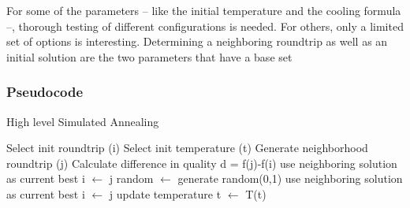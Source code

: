 For some of the parameters -- like the initial temperature and the cooling formula --, thorough testing of different configurations is needed.
For others, only a limited set of options is interesting.
Determining a neighboring roundtrip as well as an initial solution are the two parameters that have a base set 


\subsubsection{Pseudocode}
\label{subsubsec:SAPseudocode}



\begin{algorithm}
	\caption{High level Simulated Annealing}
	\label{alg:SApseudocode}
	\begin{algorithmic}[1]
		\STATE Select init roundtrip (i)
		\STATE Select init temperature (t)
				\STATE Generate neighborhood roundtrip (j)
				\STATE Calculate difference in quality d = f(j)-f(i)
						\STATE use neighboring solution as current best i $\gets$ j
					\ELSE 
						\STATE random $\gets$ generate random(0,1)
							\STATE use neighboring solution as current best i $\gets$ j
						\ENDIF
					\ENDIF
			 \ENDFOR
			 \STATE update temperature t $\gets$ T(t)
		 \ENDFOR
	\end{algorithmic}
\end{algorithm}











